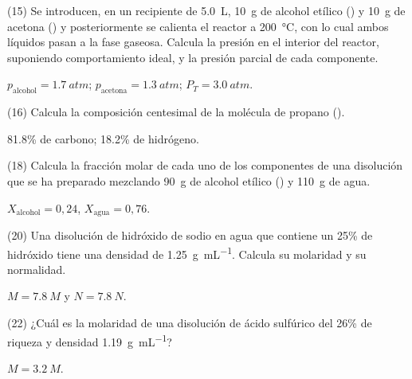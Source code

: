 \documentclass[10pt]{article}
\begin{document}
\begin{multicols}{2}
\begin{exercise}
  (15) Se introducen, en un recipiente de \SI{5.0}{\liter}, \SI{10}{\gram} de alcohol etílico () y \SI{10}{\gram} de acetona () y posteriormente se calienta el reactor a \SI{200}{\celsius}, con lo cual
  ambos líquidos pasan a la fase gaseosa. Calcula la presión en el interior del reactor, suponiendo comportamiento ideal, y la presión parcial de cada componente.
\end{exercise}
\begin{solution}
  \( p_\textrm{alcohol} = \SI{1.7}{atm} \);
  \( p_\textrm{acetona} = \SI{1.3}{atm} \);
  \( P_T = \SI{3.0}{atm} \).
\end{solution}

\begin{exercise}
  (16) Calcula la composición centesimal de la molécula de propano ().
\end{exercise}
\begin{solution}
  \num{81,8}\% de carbono; \num{18,2}\% de hidrógeno.
\end{solution}

\begin{exercise}
  (18) Calcula la fracción molar de cada uno de los componentes
  de una disolución que se ha preparado mezclando \SI{90}{\gram} de alcohol etílico () y \SI{110}{\gram} de agua.
\end{exercise}
\begin{solution}
  \( X_\textrm{alcohol} = 0,24 \),
  \( X_\textrm{agua} = 0,76 \).
\end{solution}

\begin{exercise}
  (20) Una disolución de hidróxido de sodio en agua que contiene un 25\% de hidróxido tiene una densidad de \SI{1.25}{\gram\per\milli\liter}. Calcula
  su molaridad y su normalidad.
\end{exercise}
\begin{solution}
  \( M = \SI{7.8}{M} \)  y  \( N = \SI{7.8}{N} \).
\end{solution}

\begin{exercise}
  (22) ¿Cuál es la molaridad de una disolución de ácido sulfúrico
  del 26\% de riqueza y densidad \SI{1.19}{\gram\per\milli\liter}?
\end{exercise}
\begin{solution}
  \( M = \SI{3.2}{M} \).
\end{solution}


\end{multicols}
\end{document}
